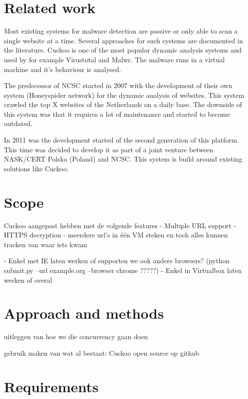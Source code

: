 \documentclass{scrartcl}
\begin{document}
\section{Related work}

Most existing systems for malware detection are passive or only able to scan a single website at a time. Several approaches for such systems are documented\cite{http://dl.acm.org.proxy.uba.uva.nl:2048/citation.cfm?doid=2089125.2089126} in the literature\cite{}. Cuckoo is one of the most popular dynamic analysis systems and used by for example Virustotal and Malwr. The malware runs in a virtual machine and it's behaviour is analysed.

The predecessor of NCSC started in 2007 with the development of their own system (Honeyspider network) for the dynamic analysis of websites. This system crawled the top X websites of the Netherlands on a daily base. The downside of this system was that it requires a lot of maintenance and started to become outdated.

In 2011 was the development started of the second generation of this platform. This time was decided to develop it as part of a joint venture between NASK/CERT Polska (Poland) and NCSC. This system is build around existing solutions like Cuckoo.

\section{Scope}

	Cuckoo aangepast hebben met de volgende features
		- Multiple URL support
		- HTTPS decryption
		- meerdere url's in één VM steken en toch alles kunnen tracken van waar iets kwam


 - Enkel met IE laten werken of supporten we ook andere browsers?
	(python submit.py --url example.org --browser chrome ?????)
 - Enkel in Virtualbox laten werken of overal


\section{Approach and methods}

uitleggen van hoe we die concurrency gaan doen

gebruik maken van wat al bestaat: Cuckoo
open source op github


\section{Requirements}
\end{document}
